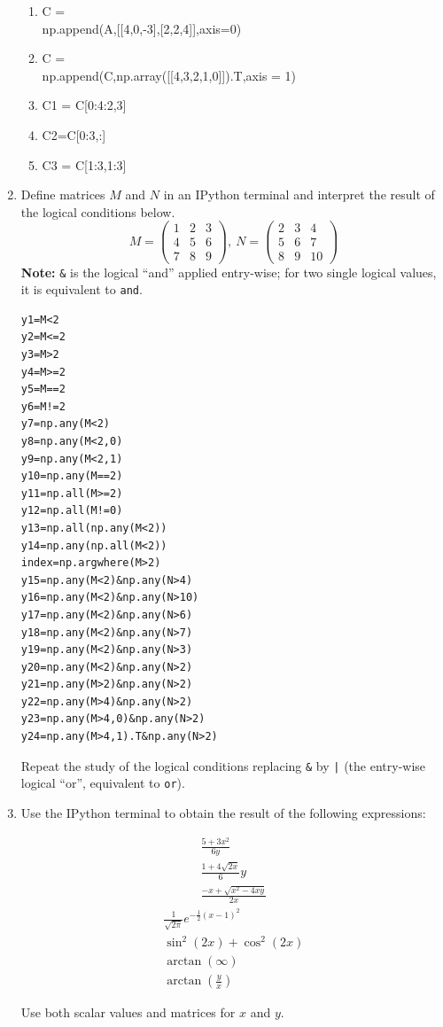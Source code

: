 \begin{enumerate}
\begin{multicols}{2}
{\begin{enumerate}
\item {\footnotesize C = \\ np.append(A,[[4,0,-3],[2,2,4]],axis=0)}
\item {\footnotesize C = \\ np.append(C,np.array([[4,3,2,1,0]]).T,axis = 1)}
\item C1 = C[0:4:2,3]
\item C2=C[0:3,:]
\item C3 = C[1:3,1:3]
\end{enumerate}
}
\end{multicols}
\item Define matrices $M$ and $N$ in an IPython terminal and interpret the result of the logical conditions below.
\begin{equation*}
M =\begin{pmatrix}
1&2&3\\
4&5&6\\
7&8&9
\end{pmatrix}, \ N=\begin{pmatrix}
2&3&4\\
5&6&7\\
8&9&10
\end{pmatrix}
\end{equation*}
\textbf{Note:} \texttt{&} is the logical ``and'' applied entry-wise; for two single logical values, it is equivalent to \texttt{and}.
\begin{verbatim}
y1=M<2
y2=M<=2
y3=M>2
y4=M>=2
y5=M==2
y6=M!=2
y7=np.any(M<2)
y8=np.any(M<2,0)
y9=np.any(M<2,1)
y10=np.any(M==2)
y11=np.all(M>=2)
y12=np.all(M!=0)
y13=np.all(np.any(M<2))
y14=np.any(np.all(M<2))
index=np.argwhere(M>2)
y15=np.any(M<2)&np.any(N>4)
y16=np.any(M<2)&np.any(N>10)
y17=np.any(M<2)&np.any(N>6)
y18=np.any(M<2)&np.any(N>7)
y19=np.any(M<2)&np.any(N>3)
y20=np.any(M<2)&np.any(N>2)
y21=np.any(M>2)&np.any(N>2)
y22=np.any(M>4)&np.any(N>2)
y23=np.any(M>4,0)&np.any(N>2)
y24=np.any(M>4,1).T&np.any(N>2)
\end{verbatim}
Repeat the study of the logical conditions replacing \texttt{&} by \texttt{|} (the entry-wise logical ``or'', equivalent to \texttt{or}).
\item Use the IPython terminal to obtain the result of the following expressions:
\begin{multicols}{2}
\begin{align*}
\frac{5+3x^2}{6y}\\
\frac{1+4\sqrt{2x}}{6}y \\
\frac{-x+\sqrt{x^2-4xy}}{2x}
\end{align*}
\begin{align*}
\frac{1}{\sqrt{2\pi}}e^{-\frac{1}{2}(x-1)^2}\\
\sin^2(2x)+\cos^2(2x) \\
\arctan(\infty)\\
\arctan\left(\frac{y}{x}\right)
\end{align*}
\end{multicols}
Use both scalar values and matrices for $x$ and $y$.


\end{enumerate}
